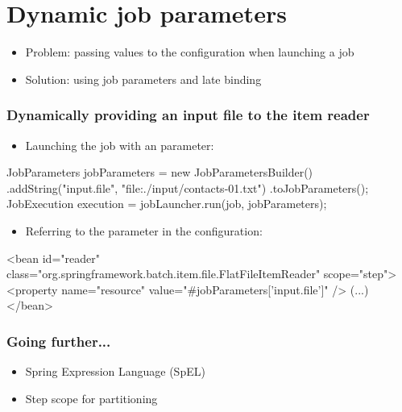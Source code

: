 \section{Dynamic job parameters}

\begin{frame}
 \begin{itemize}
  \item Problem: passing values to the configuration when launching a job
  \item Solution: using job parameters and late binding
 \end{itemize}
\end{frame}

\begin{frame}[fragile]
 \frametitle{Dynamically providing an input file to the item reader}

\begin{itemize}
 \item Launching the job with an  parameter:
\end{itemize}
 \begin{javacode}
JobParameters jobParameters = new JobParametersBuilder()
  .addString("input.file", "file:./input/contacts-01.txt")
  .toJobParameters();
JobExecution execution = jobLauncher.run(job, jobParameters);
 \end{javacode}
\begin{itemize}
 \item Referring to the  parameter in the configuration:
\end{itemize}
 \begin{xmlcode}
<bean id="reader"
      class="org.springframework.batch.item.file.FlatFileItemReader"
      scope="step">
  <property name="resource" value="#{jobParameters['input.file']}" />
  (...)
</bean>
 \end{xmlcode} 
\end{frame}

\begin{frame}
 \frametitle{Going further...}
 \begin{itemize}
  \item Spring Expression Language (SpEL)
  \item Step scope for partitioning  
 \end{itemize}
\end{frame}

